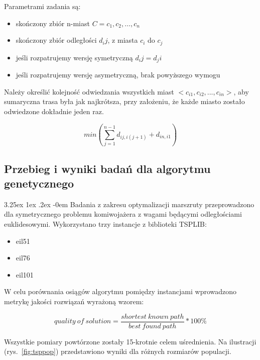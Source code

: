 \documentclass[11pt, a4paper]{article}
\makeatletter
\newcommand{\fbi}{\leavevmode{\parindent=1em\indent}}
\renewcommand\paragraph{\@startsection{paragraph}{5}{\z@}
  {3.25ex \@plus1ex \@minus.2ex}
  {-0em}
  {\normalfont\normalsize\bfseries}}
\makeatother
\begin{document}
\fbi
Parametrami zadania są:
\begin{itemize}
	\item skończony zbiór n-miast $ C = {c_1,c_2,…,c_n} $
	\item skończony zbiór odległości $ d_ij $, z miasta $ c_i $ do $ c_j $
	\item jeśli rozpatrujemy wersję symetryczną $ d_ij = d_ji $
	\item jeśli rozpatrujemy wersję asymetryczną, brak powyższego wymogu
\end{itemize}

\fbi
Należy określić kolejność odwiedzania wszystkich miast $ < c_{i1},c_{i2},...,c_{in} > $, aby sumaryczna trasa była jak najkrótsza, przy założeniu, że każde miasto zostało odwiedzone dokładnie jeden raz.

\begin{equation}\label{eq:tspproblem}
min (\sum_{j=1}^{n-1} d_{ij, i(j+1)} + d_{in, i1})
\end{equation}

\subsection{Przebieg i wyniki badań dla algorytmu genetycznego}
\paragraph{}
Badania z zakresu optymalizacji marszruty przeprowadzono dla symetrycznego problemu komiwojażera z wagami będącymi odległościami euklidesowymi. Wykorzystano trzy instancje z biblioteki TSPLIB:

\begin{itemize}
	\item eil51
	\item eil76
	\item eil101
\end{itemize}

\fbi
W celu porównania osiągów algorytmu pomiędzy instancjami wprowadzono metrykę jakości rozwiązań wyrażoną wzorem:

\begin{equation}\label{eq:tspquality}
quality\ of\ solution = \frac{shortest\ known \ path}{best\ found\ path} * 100\%
\end{equation}

\fbi
Wszystkie pomiary powtórzone zostały 15-krotnie celem uśrednienia. Na ilustracji (rys.~\ref{fig:tsppop}) przedstawiono wyniki dla różnych rozmiarów populacji.
\end{document}

